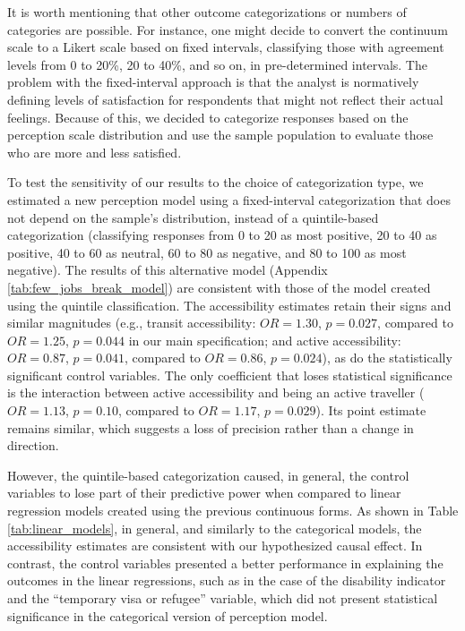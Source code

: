 \documentclass[preprint, 3p,
authoryear]{elsarticle} %
\begin{document}
It is worth mentioning that other outcome categorizations or numbers of
categories are possible. For instance, one might decide to convert the
continuum scale to a Likert scale based on fixed intervals, classifying
those with agreement levels from 0 to 20\%, 20 to 40\%, and so on, in
pre-determined intervals. The problem with the fixed-interval approach
is that the analyst is normatively defining levels of satisfaction for
respondents that might not reflect their actual feelings. Because of
this, we decided to categorize responses based on the perception scale
distribution and use the sample population to evaluate those who are
more and less satisfied.

To test the sensitivity of our results to the choice of categorization
type, we estimated a new perception model using a fixed-interval
categorization that does not depend on the sample's distribution,
instead of a quintile-based categorization (classifying responses from 0
to 20 as most positive, 20 to 40 as positive, 40 to 60 as neutral, 60 to
80 as negative, and 80 to 100 as most negative). The results of this
alternative model (Appendix \ref{tab:few_jobs_break_model}) are
consistent with those of the model created using the quintile
classification. The accessibility estimates retain their signs and
similar magnitudes (e.g., transit accessibility: \(OR = 1.30\),
\(p = 0.027\), compared to \(OR = 1.25\), \(p = 0.044\) in our main
specification; and active accessibility: \(OR = 0.87\), \(p = 0.041\),
compared to \(OR = 0.86\), \(p = 0.024\)), as do the statistically
significant control variables. The only coefficient that loses
statistical significance is the interaction between active accessibility
and being an active traveller (\(OR = 1.13\), \(p = 0.10\), compared to
\(OR = 1.17\), \(p = 0.029\)). Its point estimate remains similar, which
suggests a loss of precision rather than a change in direction.

However, the quintile-based categorization caused, in general, the
control variables to lose part of their predictive power when compared
to linear regression models created using the previous continuous forms.
As shown in Table \ref{tab:linear_models}, in general, and similarly to
the categorical models, the accessibility estimates are consistent with
our hypothesized causal effect. In contrast, the control variables
presented a better performance in explaining the outcomes in the linear
regressions, such as in the case of the disability indicator and the
``temporary visa or refugee'' variable, which did not present
statistical significance in the categorical version of perception model.
\end{document}
